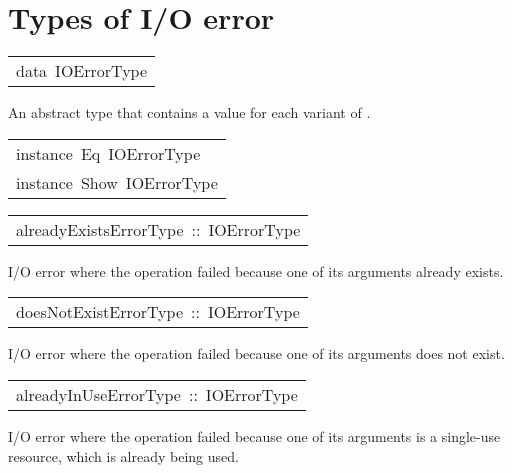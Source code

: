 \section{Types of I/O error
}
\begin{haddockdesc}
\item[\begin{tabular}{@{}l}
data\ IOErrorType
\end{tabular}]\haddockbegindoc
An abstract type that contains a value for each variant of .
\par

\end{haddockdesc}
\begin{haddockdesc}
\item[\begin{tabular}{@{}l}
instance\ Eq\ IOErrorType\\instance\ Show\ IOErrorType
\end{tabular}]
\end{haddockdesc}
\begin{haddockdesc}
\item[\begin{tabular}{@{}l}
alreadyExistsErrorType\ ::\ IOErrorType
\end{tabular}]\haddockbegindoc
I/O error where the operation failed because one of its arguments
 already exists.
\par

\end{haddockdesc}
\begin{haddockdesc}
\item[\begin{tabular}{@{}l}
doesNotExistErrorType\ ::\ IOErrorType
\end{tabular}]\haddockbegindoc
I/O error where the operation failed because one of its arguments
 does not exist.
\par

\end{haddockdesc}
\begin{haddockdesc}
\item[\begin{tabular}{@{}l}
alreadyInUseErrorType\ ::\ IOErrorType
\end{tabular}]\haddockbegindoc
I/O error where the operation failed because one of its arguments
 is a single-use resource, which is already being used.
\par

\end{haddockdesc}
